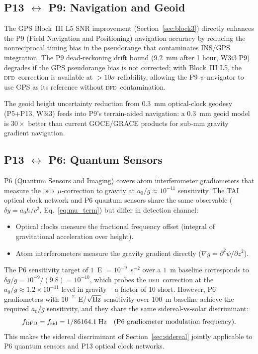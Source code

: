 \documentclass[aps,prd,twocolumn,superscriptaddress,nofootinbib]{revtex4-2}
\newcommand{\DFD}{\textsc{dfd}}
\begin{document}
\subsection{P13 $\leftrightarrow$ P9: Navigation and Geoid}

The GPS Block~III L5 SNR improvement (Section~\ref{sec:block3}) directly
enhances the P9 (Field Navigation and Positioning) navigation accuracy
by reducing the nonreciprocal timing bias in the pseudorange that
contaminates INS/GPS integration. The P9 dead-reckoning drift bound
($9.2$~mm after 1 hour, W3i3 P9) degrades if the GPS pseudorange bias is
not corrected; with Block~III L5, the \DFD\ correction is available
at $>10\sigma$ reliability, allowing the P9 $\psi$-navigator to use
GPS as its reference without \DFD\ contamination.

The geoid height uncertainty reduction from $0.3$~mm optical-clock geodesy
(P5+P13, W3i3) feeds into P9's terrain-aided navigation: a $0.3$~mm geoid
model is $30\times$ better than current GOCE/GRACE products for sub-mm
gravity gradient navigation.

\subsection{P13 $\leftrightarrow$ P6: Quantum Sensors}

P6 (Quantum Sensors and Imaging) covers atom interferometer gradiometers
that measure the \DFD\ $\mu$-correction to gravity at $a_0/g \approx 10^{-11}$
sensitivity. The TAI optical clock network and P6 quantum sensors share
the same observable ($\delta y = a_0 h/c^2$, Eq.~\ref{eq:mu_term}) but
differ in detection channel:
\begin{itemize}
\item Optical clocks measure the fractional frequency offset (integral of
      gravitational acceleration over height).
\item Atom interferometers measure the gravity gradient directly
      ($\nabla g = \partial^2\psi/\partial z^2$).
\end{itemize}
The P6 sensitivity target of $1$~E $= 10^{-9}$~s$^{-2}$ over a $1$~m baseline
corresponds to $\delta g / g = 10^{-9}/(9.8) = 10^{-10}$, which probes the
\DFD\ correction at the $a_0/g \approx 1.2\times10^{-11}$ level in gravity --
a factor of 10 short. However, P6 gradiometers with $10^{-2}$~E/$\sqrt{\rm Hz}$
sensitivity over $100$~m baseline achieve the required $a_0/g$ sensitivity,
and they share the same sidereal-vs-solar discriminant:
\begin{equation}
f_{\rm DFD} = f_{\rm sid} = 1/86164.1\;\text{Hz}
\quad (\text{P6 gradiometer modulation frequency}).
\end{equation}
This makes the sidereal discriminant of Section~\ref{sec:sidereal} jointly
applicable to P6 quantum sensors and P13 optical clock networks.
\end{document}
